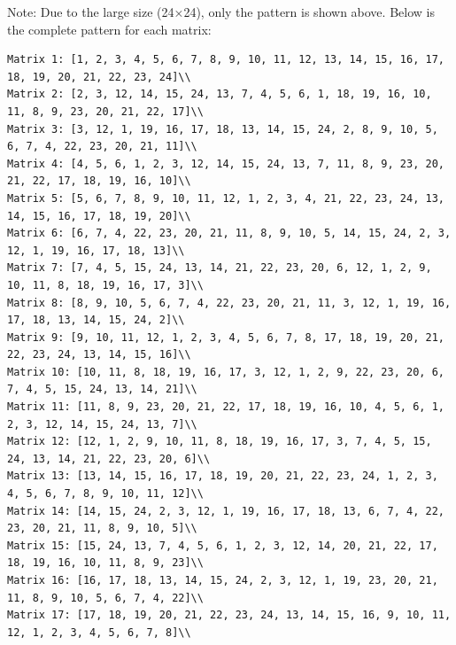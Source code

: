 \documentclass{article}
\begin{document}
\begin{scriptsize}
Note: Due to the large size (24×24), only the pattern is shown above. Below is the complete pattern for each matrix:

\begin{verbatim}
Matrix 1: [1, 2, 3, 4, 5, 6, 7, 8, 9, 10, 11, 12, 13, 14, 15, 16, 17, 18, 19, 20, 21, 22, 23, 24]\\
Matrix 2: [2, 3, 12, 14, 15, 24, 13, 7, 4, 5, 6, 1, 18, 19, 16, 10, 11, 8, 9, 23, 20, 21, 22, 17]\\
Matrix 3: [3, 12, 1, 19, 16, 17, 18, 13, 14, 15, 24, 2, 8, 9, 10, 5, 6, 7, 4, 22, 23, 20, 21, 11]\\
Matrix 4: [4, 5, 6, 1, 2, 3, 12, 14, 15, 24, 13, 7, 11, 8, 9, 23, 20, 21, 22, 17, 18, 19, 16, 10]\\
Matrix 5: [5, 6, 7, 8, 9, 10, 11, 12, 1, 2, 3, 4, 21, 22, 23, 24, 13, 14, 15, 16, 17, 18, 19, 20]\\
Matrix 6: [6, 7, 4, 22, 23, 20, 21, 11, 8, 9, 10, 5, 14, 15, 24, 2, 3, 12, 1, 19, 16, 17, 18, 13]\\
Matrix 7: [7, 4, 5, 15, 24, 13, 14, 21, 22, 23, 20, 6, 12, 1, 2, 9, 10, 11, 8, 18, 19, 16, 17, 3]\\
Matrix 8: [8, 9, 10, 5, 6, 7, 4, 22, 23, 20, 21, 11, 3, 12, 1, 19, 16, 17, 18, 13, 14, 15, 24, 2]\\
Matrix 9: [9, 10, 11, 12, 1, 2, 3, 4, 5, 6, 7, 8, 17, 18, 19, 20, 21, 22, 23, 24, 13, 14, 15, 16]\\
Matrix 10: [10, 11, 8, 18, 19, 16, 17, 3, 12, 1, 2, 9, 22, 23, 20, 6, 7, 4, 5, 15, 24, 13, 14, 21]\\
Matrix 11: [11, 8, 9, 23, 20, 21, 22, 17, 18, 19, 16, 10, 4, 5, 6, 1, 2, 3, 12, 14, 15, 24, 13, 7]\\
Matrix 12: [12, 1, 2, 9, 10, 11, 8, 18, 19, 16, 17, 3, 7, 4, 5, 15, 24, 13, 14, 21, 22, 23, 20, 6]\\
Matrix 13: [13, 14, 15, 16, 17, 18, 19, 20, 21, 22, 23, 24, 1, 2, 3, 4, 5, 6, 7, 8, 9, 10, 11, 12]\\
Matrix 14: [14, 15, 24, 2, 3, 12, 1, 19, 16, 17, 18, 13, 6, 7, 4, 22, 23, 20, 21, 11, 8, 9, 10, 5]\\
Matrix 15: [15, 24, 13, 7, 4, 5, 6, 1, 2, 3, 12, 14, 20, 21, 22, 17, 18, 19, 16, 10, 11, 8, 9, 23]\\
Matrix 16: [16, 17, 18, 13, 14, 15, 24, 2, 3, 12, 1, 19, 23, 20, 21, 11, 8, 9, 10, 5, 6, 7, 4, 22]\\
Matrix 17: [17, 18, 19, 20, 21, 22, 23, 24, 13, 14, 15, 16, 9, 10, 11, 12, 1, 2, 3, 4, 5, 6, 7, 8]\\

\end{verbatim}
\end{scriptsize}
\end{document}
